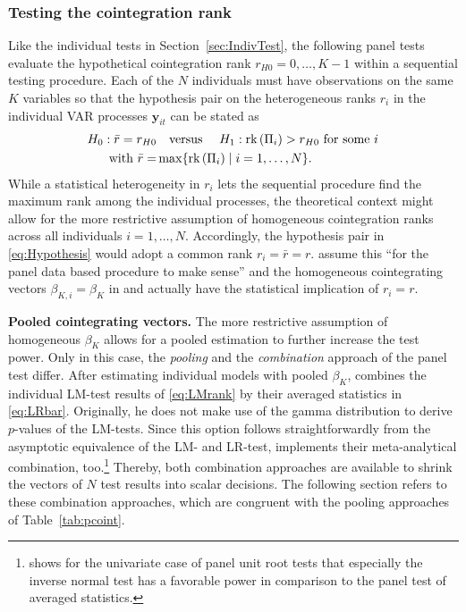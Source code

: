\subsubsection{Testing the cointegration rank}
Like the individual tests in Section~\ref{sec:IndivTest}, the following panel tests evaluate the hypothetical cointegration rank $ r_{H0}=0, \ldots, K-1 $ within a sequential testing procedure. Each of the $ N $ individuals must have observations on the same $ K $ variables so that the hypothesis pair on the heterogeneous ranks $ r_i $ in the individual VAR processes $ \boldsymbol{y}_{it} $ can be stated as
\begin{align} \label{eq:Hypothesis}
\begin{split}
	H_0: \bar{r} = r_{H0} & \text{\quad versus \quad} H_1: \text{rk}\left( \Pi_i \right) > r_{H0} \ \text{for some} \ i \\
	\text{with} \ \bar{r} = & \max \{ \text{rk}\left( \Pi_i \right) \mid i=1, \ldots, N \}.
\end{split}
\end{align}
While a statistical heterogeneity in $ r_i $ lets the sequential procedure find the maximum rank among the individual processes, the theoretical context might allow for the more restrictive assumption of homogeneous cointegration ranks across all individuals $ i=1,\ldots,N$. Accordingly, the hypothesis pair in \eqref{eq:Hypothesis} would adopt a common rank $ r_i = \bar{r} = r $. \citet[p.~9]{SilvestreSurdeanu2011} assume this ``for the panel data based procedure to make sense'' and the homogeneous cointegrating vectors $ \beta_{K,i} = \beta_K $ in \citet{Breitung2005} and \citet{GroenFrank2003} actually have the statistical implication of $ r_i = r $.


\textbf{Pooled cointegrating vectors.} The more restrictive assumption of homogeneous $ \beta_K $ allows for a pooled estimation to further increase the test power. Only in this case, the \textit{pooling} and the \textit{combination} approach of the panel test differ. After estimating individual models with pooled $ \beta_K $, \citet{Breitung2005} combines the individual LM-test results of \eqref{eq:LMrank} by their averaged statistics in \eqref{eq:LRbar}. Originally, he does not make use of the gamma distribution to derive $p$-values of the LM-tests. Since this option follows straightforwardly from the asymptotic equivalence of the LM- and LR-test,  implements their meta-analytical combination, too.\footnote{\citet[p.~268]{Choi2001} shows for the univariate case of panel unit root tests that especially the inverse normal test has a favorable power in comparison to the panel test of averaged statistics.} Thereby, both combination approaches are available to shrink the vectors of $ N $ test results into scalar decisions. The following section refers to these combination approaches, which are congruent with the pooling approaches of Table~\ref{tab:pcoint}.


